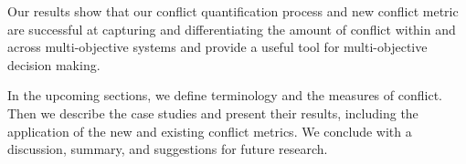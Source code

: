 Our results show that our conflict quantification process and new conflict metric are successful at capturing and differentiating the amount of conflict within and across multi-objective systems and provide a useful tool for multi-objective decision making.

In the upcoming sections, we define terminology and the measures of conflict. Then we describe the case studies and present their results, including the application of the new and existing conflict metrics. We conclude with a discussion, summary, and suggestions for future research.